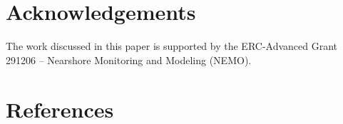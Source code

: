 \documentclass[preprint,12pt,authoryear]{elsarticle}
\begin{document}


\section*{Acknowledgements}
The work discussed in this paper is supported by the ERC-Advanced
Grant 291206 -- Nearshore Monitoring and Modeling (NEMO).

\appendix



\section*{References}
{}
\end{document}
